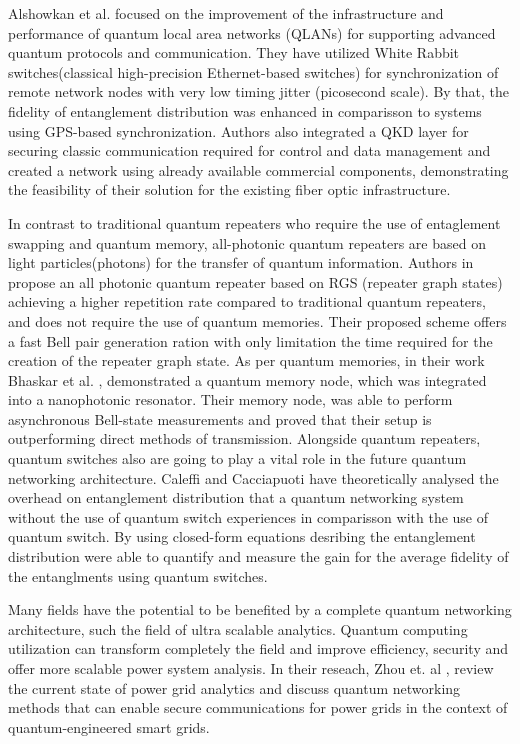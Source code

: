 		Alshowkan et al.\cite{advance-arch} focused on the improvement of the infrastructure 
		and performance of quantum local area networks (QLANs) for supporting advanced quantum protocols
		and communication. They have utilized White Rabbit switches(classical high-precision Ethernet-based switches) for synchronization
		of remote network nodes with very low timing jitter (picosecond scale). 
		By that, the fidelity of entanglement distribution was enhanced in comparisson to systems using GPS-based synchronization.
		Authors also integrated a QKD layer for securing classic communication required for control and data management and
		created a network using already available commercial components, demonstrating the feasibility of their solution
		for the existing fiber optic infrastructure.


		In contrast to traditional quantum repeaters who require the use of entaglement swapping and quantum memory, all-photonic quantum repeaters
		are based on light particles(photons) for the transfer of quantum information.
		Authors in \cite{repeater1} propose an all photonic quantum repeater 
		based on RGS (repeater graph states) achieving a higher repetition rate compared to traditional quantum repeaters, and does not require 
		the use of quantum memories. Their proposed scheme offers a fast Bell pair generation ration with only
		limitation the time required for the creation of the repeater graph state. 
		As per quantum memories, in their work Bhaskar et al. \cite{memories}, demonstrated a quantum memory node, which
		was integrated into a nanophotonic resonator. Their memory node, was able to perform asynchronous Bell-state measurements
		and proved that their setup is outperforming direct methods of transmission. Alongside quantum repeaters, quantum switches also
		are going to play a vital role in the future quantum networking architecture. Caleffi and Cacciapuoti \cite{quantum-switch1}
		have theoretically analysed the overhead on entanglement distribution that a quantum networking system 
		without the use of quantum switch experiences in comparisson with the use of quantum switch. By using closed-form equations
		desribing the entanglement distribution were able to quantify and measure the gain for the average fidelity of the entanglments
		using quantum switches.
	
				
		Many fields have the potential to be benefited by a complete quantum networking architecture, 
		such the field of ultra scalable analytics. Quantum computing utilization can transform completely
		the field and improve efficiency, security and offer more scalable power system analysis.
		In their reseach, Zhou et. al \cite{powergrid}, review the current state of power grid analytics 
		and discuss quantum networking methods that can enable secure communications for power grids 
		in the context of quantum-engineered smart grids.

